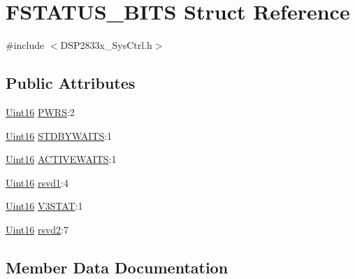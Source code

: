 \hypertarget{struct_f_s_t_a_t_u_s___b_i_t_s}{}\section{F\+S\+T\+A\+T\+U\+S\+\_\+\+B\+I\+T\+S Struct Reference}
\label{struct_f_s_t_a_t_u_s___b_i_t_s}


{\ttfamily \#include $<$D\+S\+P2833x\+\_\+\+Sys\+Ctrl.\+h$>$}

\subsection*{Public Attributes}
\begin{DoxyCompactItemize}
\item 
\hyperlink{_d_s_p2833x___device_8h_a59a9f6be4562c327cbfb4f7e8e18f08b}{Uint16} \hyperlink{struct_f_s_t_a_t_u_s___b_i_t_s_a0c2da5d8192ee49caf2ee5cd99ce6156}{P\+W\+R\+S}\+:2
\item 
\hyperlink{_d_s_p2833x___device_8h_a59a9f6be4562c327cbfb4f7e8e18f08b}{Uint16} \hyperlink{struct_f_s_t_a_t_u_s___b_i_t_s_acb8fd0ba47941bb14991829c4338e301}{S\+T\+D\+B\+Y\+W\+A\+I\+T\+S}\+:1
\item 
\hyperlink{_d_s_p2833x___device_8h_a59a9f6be4562c327cbfb4f7e8e18f08b}{Uint16} \hyperlink{struct_f_s_t_a_t_u_s___b_i_t_s_a94ed8236a55892509cd30e8c9ad9d0a2}{A\+C\+T\+I\+V\+E\+W\+A\+I\+T\+S}\+:1
\item 
\hyperlink{_d_s_p2833x___device_8h_a59a9f6be4562c327cbfb4f7e8e18f08b}{Uint16} \hyperlink{struct_f_s_t_a_t_u_s___b_i_t_s_aee514807140c6a9d0817d8487c8f17c5}{rsvd1}\+:4
\item 
\hyperlink{_d_s_p2833x___device_8h_a59a9f6be4562c327cbfb4f7e8e18f08b}{Uint16} \hyperlink{struct_f_s_t_a_t_u_s___b_i_t_s_aa00cd6ec86807a3d218d670b06526007}{V3\+S\+T\+A\+T}\+:1
\item 
\hyperlink{_d_s_p2833x___device_8h_a59a9f6be4562c327cbfb4f7e8e18f08b}{Uint16} \hyperlink{struct_f_s_t_a_t_u_s___b_i_t_s_ad12c115aa33da7b47f2a205ca7fa8698}{rsvd2}\+:7
\end{DoxyCompactItemize}


\subsection{Member Data Documentation}
\hypertarget{struct_f_s_t_a_t_u_s___b_i_t_s_a94ed8236a55892509cd30e8c9ad9d0a2}{}
